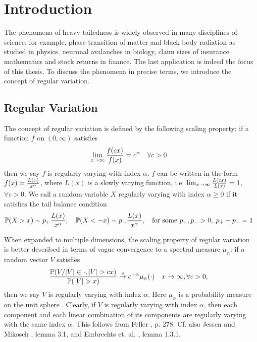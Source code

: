 \chapter{Introduction}\label{ch:intr}
The phenomena of heavy-tailedness is widely observed in many
disciplines of science, for example, phase transition of matter and
black body radiation as studied in physics, neuronal avalanches in
biology, claim sizes of insurance mathematics and stock returns in
finance. The last application is indeed the focus of this thesis. To
discuss the phenomena in precise terms, we introduce the concept of
regular variation.

\section{Regular Variation}
The concept of regular variation is defined by the following scaling
property: if a function $f$ on $(0, \infty)$ satisfies
\[
\lim_{x \to \infty} {f(c x) \over f(x)} = c^\alpha
\quad
\forall c > 0
\]
then we say $f$ is regularly varying with index $\alpha$.
$f$ can be written in the form $f(x) = {L(x) \over x^\alpha}$, where
$L(x)$ is a slowly varying function, i.e.
$\lim_{x \to \infty} {L(c x) \over L(x)} = 1$, $\forall c > 0$.
We call a random variable $X$ regularly varying with index
$\alpha \geq 0$ if it satisfies the tail balance condition
\[
\P(X > x) \sim p_+ {L(x) \over x^\alpha},\quad
\P(X < -x) \sim p_- {L(x) \over x^\alpha}, \quad
\text{for some } p_+, p_- > 0,\; p_+ + p_- = 1
\]

When expanded to multiple dimensions, the scaling property of regular
variation is better described in terms of vague convergence to a
spectral measure $\mu_\alpha$: if a random vector $V$ satisfies
\[
{
  \P(V/|V| \in \cdot, |V| > c x)
  \over
  \P(|V| > x)
}
\overset{v}{\to} c^{-\alpha} \mu_\alpha(\cdot)
\quad
x \to \infty, \forall c > 0,
\]
then we say $V$ is regularly varying with index $\alpha$. Here
$\mu_\alpha$ is a probability measure on the unit sphere
\cite{buraczewski:damek:mikosch:2016}. Clearly, if $V$
is regularly varying with index $\alpha$, then each component
and each linear combination of its components are regularly
varying with the same index $\alpha$. This follows from Feller
\cite{feller}, p. 278. Cf. also Jessen and Mikosch
\cite{JessenMikosch2006}, lemma 3.1, and Embrechts et. al.
\cite{embrechts:klueppelberg:mikosch:1997}, lemma 1.3.1.

